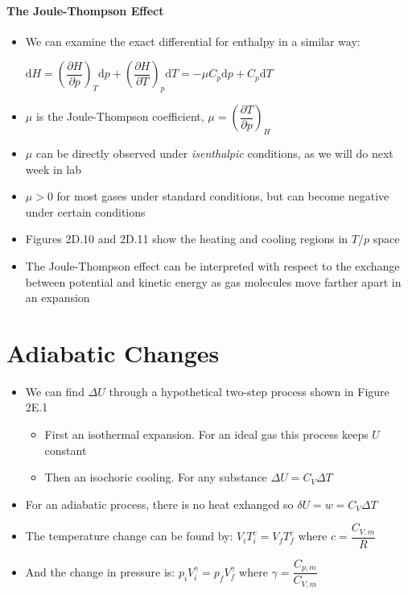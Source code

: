 \documentclass[12pt, openany, letterpaper]{memoir}
\begin{document}
\paragraph{The Joule-Thompson Effect}
\begin{itemize}
	\item We can examine the exact differential for enthalpy in a similar way: 
	
	$\mathrm{d}H = \left(\dfrac{\partial H}{\partial p}\right)_T\mathrm{d}p + \left(\dfrac{\partial H}{\partial T}\right)_p\mathrm{d}T = -\mu C_p\mathrm{d}p + C_p\mathrm{d}T$
	\item $\mu$ is the Joule-Thompson coefficient, $\mu = \left(\dfrac{\partial T}{\partial p}\right)_H$
	\item $\mu$ can be directly observed under \emph{isenthalpic} conditions, as we will do next week in lab
	\item $\mu > 0$ for most gases under standard conditions, but can become negative under certain conditions
	\item Figures 2D.10 and 2D.11 show the heating and cooling regions in $T$/$p$ space
	\item The Joule-Thompson effect can be interpreted with respect to the exchange between potential and kinetic energy as gas molecules move farther apart in an expansion
\end{itemize}


\section{Adiabatic Changes}
\begin{itemize}	
	\item We can find $\Delta U$ through a hypothetical two-step process shown in Figure 2E.1
	\begin{itemize}
		\item First an isothermal expansion. For an ideal gas this process keeps $U$ constant
		\item Then an isochoric cooling. For any substance $\Delta U = C_V\Delta T$
	\end{itemize}
	\item For an adiabatic process, there is no heat exhanged so $\delta U = w = C_V\Delta T$
	\item The temperature change can be found by: $V_iT_i^c = V_fT_f^c$ where $c=\dfrac{C_{V,m}}{R}$
	\item And the change in pressure is: $p_iV_i^\gamma=p_fV_f^\gamma$ where $\gamma = \dfrac{C_{p,m}}{C_{V,m}}$
\end{itemize}
\end{document}
